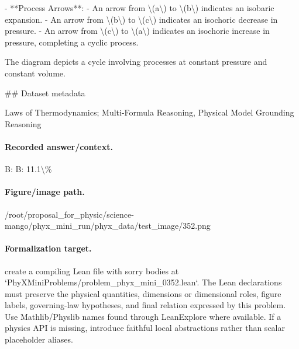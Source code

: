 - **Process Arrows**:
  - An arrow from \textbackslash{}(a\textbackslash{}) to \textbackslash{}(b\textbackslash{}) indicates an isobaric expansion.
  - An arrow from \textbackslash{}(b\textbackslash{}) to \textbackslash{}(c\textbackslash{}) indicates an isochoric decrease in pressure.
  - An arrow from \textbackslash{}(c\textbackslash{}) to \textbackslash{}(a\textbackslash{}) indicates an isochoric increase in pressure, completing a cyclic process.

The diagram depicts a cycle involving processes at constant pressure and constant volume.

\#\# Dataset metadata

Laws of Thermodynamics; Multi-Formula Reasoning, Physical Model Grounding Reasoning

\paragraph{Recorded answer/context.}
B: B: 11.1\textbackslash{}\%

\paragraph{Figure/image path.}
/root/proposal\_for\_physic/science-mango/phyx\_mini\_run/phyx\_data/test\_image/352.png

\paragraph{Formalization target.}
create a compiling Lean file with sorry bodies at `PhyXMiniProblems/problem\_phyx\_mini\_0352.lean`. The Lean declarations must preserve the physical quantities, dimensions or dimensional roles, figure labels, governing-law hypotheses, and final relation expressed by this problem.
Use Mathlib/Physlib names found through LeanExplore where available. If a physics API is missing, introduce faithful local abstractions rather than scalar placeholder aliases.

